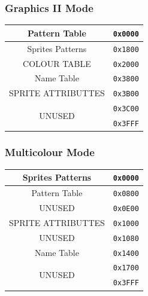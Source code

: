 \documentclass[a4paper,11pt]{article}
\begin{document}
        \subsubsection{Graphics II Mode}
        \begin{center}
            \begin{tabular}{c r}
                \hline
                Pattern Table           & \texttt{0x0000}\\
                \hline
                Sprites Patterns         & \texttt{0x1800}\\
                \hline
                COLOUR TABLE            & \texttt{0x2000}\\
                \hline
                Name Table              & \texttt{0x3800}\\
                \hline
                SPRITE ATTRIBUTTES      & \texttt{0x3B00}\\
                \hline
                \multirow{2}{*}{UNUSED} & \texttt{0x3C00}\\
                                        & \texttt{0x3FFF}\\
                \hline
            \end{tabular}
        \end{center}

        \subsubsection{Multicolour Mode}
        \begin{center}
            \begin{tabular}{c r}
                \hline
                Sprites Patterns         & \texttt{0x0000}\\
                \hline
                Pattern Table           & \texttt{0x0800}\\
                \hline
                UNUSED                  & \texttt{0x0E00}\\
                \hline
                SPRITE ATTRIBUTTES      & \texttt{0x1000}\\
                \hline
                UNUSED                  & \texttt{0x1080}\\
                \hline
                Name Table              & \texttt{0x1400}\\
                \hline
                \multirow{2}{*}{UNUSED} & \texttt{0x1700}\\
                                        & \texttt{0x3FFF}\\
                \hline
            \end{tabular}
        \end{center}
\end{document}

